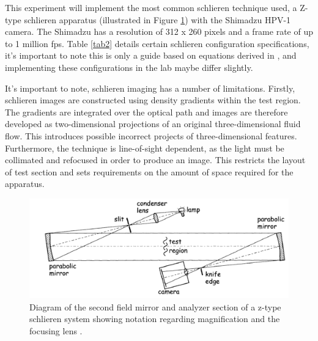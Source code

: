 This experiment will implement the most common schlieren technique used, a Z-type schlieren apparatus (illustrated in Figure \ref{fig:3}) with the Shimadzu HPV-1 camera. The Shimadzu has a resolution of 312 x 260 pixels and a frame rate of up to 1 million fps. Table \ref{tab2} details certain schlieren configuration specifications, it's important to note this is only a guide based on equations derived in \cite{settles2012}, and implementing these configurations in the lab maybe differ slightly.

It's important to note, schlieren imaging has a number of limitations. Firstly, schlieren images are constructed using density gradients within the test region. The gradients are integrated over the optical path and images are therefore developed as two-dimensional projections of an original three-dimensional fluid flow. This introduces possible incorrect projects of three-dimensional features. Furthermore, the technique is line-of-sight dependent, as the light must be collimated and refocused in order to produce an image. This restricts the layout of test section and sets requirements on the amount of space required for the apparatus. 

\begin{figure}[H] 
	\centering
	\includegraphics[scale=0.7]{fig3.PNG} 
	\caption{Diagram of the second field mirror and analyzer section of a z-type schlieren
		system showing notation regarding magnification and the focusing lens \cite{settles2012}.}
	\label{fig:3}
\end{figure}

